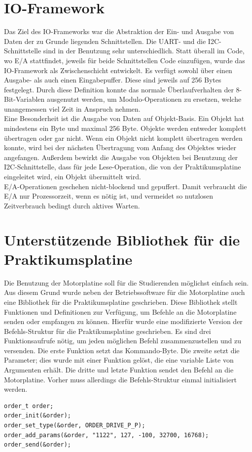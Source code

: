 \section{IO-Framework}
Das Ziel des IO-Frameworks war die Abstraktion der Ein- und Ausgabe von Daten der zu Grunde liegenden Schnittstellen.
Die UART- und die I2C-Schnittstelle sind in der Benutzung sehr unterschiedlich. Statt überall im Code, wo E/A stattfindet,
jeweils für beide Schnittstellen Code einzufügen, wurde das IO-Framework als Zwischenschicht entwickelt. Es verfügt sowohl
über einen Ausgabe- als auch einen Eingabepuffer. Diese sind jeweils auf 256 Bytes festgelegt. Durch diese Definition
konnte das normale Überlaufverhalten der 8-Bit-Variablen ausgenutzt werden, um Modulo-Operationen zu ersetzen, welche
unangemessen viel Zeit in Anspruch nehmen.\\
Eine Besonderheit ist die Ausgabe von Daten auf Objekt-Basis. Ein Objekt hat mindestens ein Byte und maximal 256 Byte. Objekte
werden entweder komplett übertragen oder gar nicht. Wenn ein Objekt nicht komplett übertragen werden konnte, wird bei der
nächsten Übertragung vom Anfang des Objektes wieder angefangen. Außerdem bewirkt die Ausgabe von Objekten bei Benutzung der
I2C-Schnittstelle, dass für jede Lese-Operation, die von der Praktikumsplatine eingeleitet wird, ein Objekt übermittelt wird.\\
E/A-Operationen geschehen nicht-blockend und gepuffert. Damit verbraucht die E/A nur Prozessorzeit, wenn es nötig ist, und
vermeidet so nutzlosen Zeitverbrauch bedingt durch aktives Warten.

\section{Unterstützende Bibliothek für die Praktikumsplatine}
Die Benutzung der Motorplatine soll für die Studierenden möglichst einfach sein.
Aus diesem Grund wurde neben der Betriebssoftware für die Motorplatine auch eine
Bibliothek für die Praktikumsplatine geschrieben. Diese Bibliothek stellt
Funktionen und Definitionen zur Verfügung, um Befehle an die Motorplatine
senden oder empfangen zu können. Hierfür wurde eine modifizierte Version der
Befehls-Struktur für die Praktikumsplatine geschrieben. Es sind drei Funktionsaufrufe
nötig, um jeden möglichen Befehl zusammenzustellen und zu versenden. Die erste
Funktion setzt das Kommando-Byte. Die zweite setzt die Parameter; dies wurde
mit einer Funktion gelöst, die eine variable Liste von Argumenten erhält. Die dritte und
letzte Funktion sendet den Befehl an die Motorplatine. Vorher muss allerdings die
Befehls-Struktur einmal initialisiert werden.
\begin{verbatim}
order_t order;
order_init(&order);
order_set_type(&order, ORDER_DRIVE_P_P);
order_add_params(&order, "1122", 127, -100, 32700, 16768);
order_send(&order);
\end{verbatim}
